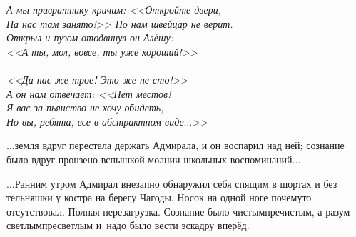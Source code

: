 \vspace{0.5cm}
\noindent\textit{%
	\hspace*{1.5cm}А мы привратнику кричим: <<Откройте двери, \\
	\hspace*{1.5cm}На нас там занято!>> Но нам швейцар не верит. \\
	\hspace*{1.5cm}Открыл и пузом отодвинул он Алёшу: \\
	\hspace*{1.5cm}<<А ты, мол, вовсе, ты уже хороший!>>\\
	\\
	\hspace*{1.5cm}<<Да нас же трое! Это же не сто!>>\\
	\hspace*{1.5cm}А он нам отвечает: <<Нет местов!\\
	\hspace*{1.5cm}Я вас за пьянство не хочу обидеть,\\
	\hspace*{1.5cm}Но вы, ребята, все в абстрактном виде$\ldots$>> 
}
\vspace{0.5cm}

$\ldots$земля вдруг перестала держать Адмирала, и он воспарил над ней; сознание было вдруг пронзено вспышкой молнии школьных воспоминаний$\ldots$







$\ldots$Ранним утром Адмирал внезапно обнаружил себя спящим в шортах и без тельняшки у костра на берегу Чагоды. Носок на одной ноге почему\sdash то отсутствовал. Полная перезагрузка. Сознание было чистым\sdash пречистым, а разум светлым\sdash пресветлым и~надо было вести эскадру вперёд.

\begin{center}
\end{center}
